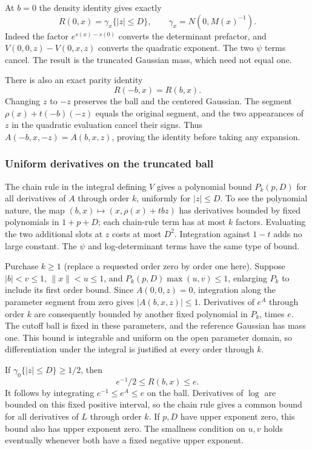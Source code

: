 At $b=0$ the density identity gives exactly
\begin{equation}\label{eq:stationary-zero-mass}
                   R(0,x)=\gamma_x\{|z|\le D\},
                         \qquad \gamma_x=N(0,M(x)^{-1}).
\end{equation}
Indeed the factor $e^{s(x)-s(0)}$ converts the determinant prefactor,
and $V(0,0,z)-V(0,x,z)$ converts the quadratic exponent. The two
$\psi$ terms cancel. The result is the truncated Gaussian mass,
which need not equal one.

There is also an exact parity identity
\begin{equation}\label{eq:stationary-even}
                            R(-b,x)=R(b,x).
\end{equation}
Changing $z$ to $-z$ preserves the ball and the centered Gaussian.
The segment $\rho(x)+t(-b)(-z)$ equals the original segment, and
the two appearances of $z$ in the quadratic evaluation cancel their
signs. Thus $A(-b,x,-z)=A(b,x,z)$, proving the identity before taking
any expansion.

\subsubsection{Uniform derivatives on the truncated ball}
The chain rule in the integral defining $V$ gives a polynomial bound
$P_k(p,D)$ for all derivatives of $A$ through order $k$, uniformly
for $|z|\le D$. To see the polynomial nature, the map
$(b,x)\mapsto(x,\rho(x)+tbz)$ has derivatives bounded by fixed
polynomials in $1+p+D$; each chain-rule term has at most $k$
factors. Evaluating the two additional slots at $z$ costs at most
$D^2$. Integration against $1-t$ adds no large constant. The
$\psi$ and log-determinant terms have the same type of bound.

Purchase $k\ge1$ (replace a requested order zero by order one here).
Suppose $|b|<v\le1$, $\|x\|<u\le1$, and
$P_k(p,D)\max(u,v)\le1$, enlarging $P_k$ to include its first
order bound. Since $A(0,0,z)=0$, integration along the parameter
segment from zero gives $|A(b,x,z)|\le1$. Derivatives of $e^A$
through order $k$ are consequently bounded by another fixed
polynomial in $P_k$, times $e$. The cutoff ball is fixed in these
parameters, and the reference Gaussian has mass one. This bound is
integrable and uniform on the open parameter domain, so differentiation
under the integral is justified at every order through $k$.

If $\gamma_0\{|z|\le D\}\ge1/2$, then
\begin{equation}\label{eq:stationary-positive-range}
                              e^{-1}/2\le R(b,x)\le e.
\end{equation}
It follows by integrating $e^{-1}\le e^A\le e$ on the ball.
Derivatives of $\log$ are bounded on this fixed positive interval,
so the chain rule gives a common bound for all derivatives of $L$
through order $k$. If $p,D$ have upper exponent zero, this bound
also has upper exponent zero. The smallness condition on $u,v$
holds eventually whenever both have a fixed negative upper exponent.

